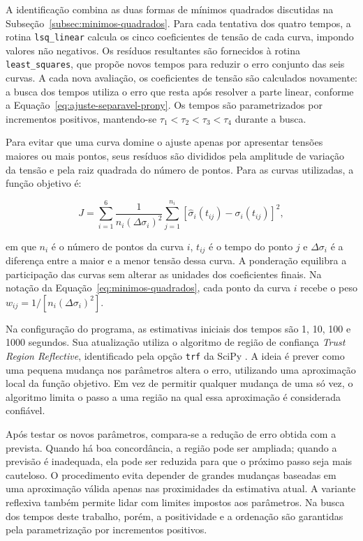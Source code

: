\documentclass[arial,centeredequations,english,brazilian,oneside,section=TITLE]{ifes8}
\begin{document}
A identificação combina as duas formas de mínimos quadrados discutidas na
Subseção~\ref{subsec:minimos-quadrados}. Para cada tentativa dos quatro tempos,
a rotina \texttt{lsq\_linear} calcula os cinco coeficientes de tensão de cada
curva, impondo valores não negativos. Os resíduos resultantes são fornecidos
à rotina \texttt{least\_squares}, que propõe novos tempos para reduzir o erro
conjunto das seis curvas. A cada nova avaliação, os coeficientes de tensão
são calculados novamente: a busca dos tempos utiliza o erro que resta após
resolver a parte linear, conforme a Equação~\eqref{eq:ajuste-separavel-prony}.
Os tempos são parametrizados por incrementos positivos, mantendo-se
$\tau_1<\tau_2<\tau_3<\tau_4$ durante a busca.

Para evitar que uma curva domine o ajuste apenas por apresentar tensões maiores ou mais
pontos, seus resíduos são divididos pela amplitude de variação da tensão e pela raiz
quadrada do número de pontos. Para as curvas utilizadas, a função objetivo é:

\begin{equation}
  \label{eq:objetivo-ajuste-global}
  J=\sum_{i=1}^{6}\frac{1}{n_i(\Delta\sigma_i)^2}
  \sum_{j=1}^{n_i}
  \left[\widehat{\sigma}_i(t_{ij})-\sigma_i(t_{ij})\right]^2,
\end{equation}

em que $n_i$ é o número de pontos da curva $i$, $t_{ij}$ é o tempo do ponto $j$ e
$\Delta\sigma_i$ é a diferença entre a maior e a menor tensão dessa curva. A ponderação
equilibra a participação das curvas sem alterar as unidades dos coeficientes finais.
Na notação da Equação~\eqref{eq:minimos-quadrados}, cada ponto da curva $i$
recebe o peso $w_{ij}=1/[n_i(\Delta\sigma_i)^2]$.

Na configuração do programa, as estimativas iniciais dos tempos são 1, 10, 100 e
1000 segundos. Sua atualização utiliza o algoritmo de região de confiança
\emph{Trust Region Reflective}, identificado pela opção \texttt{trf} da SciPy
\cite{SciPyLeastSquares}. A ideia é prever como uma pequena mudança nos parâmetros altera
o erro, utilizando uma aproximação local da função objetivo. Em vez de permitir qualquer
mudança de uma só vez, o algoritmo limita o passo a uma região na qual essa aproximação
é considerada confiável.

Após testar os novos parâmetros, compara-se a redução de erro obtida com a prevista.
Quando há boa concordância, a região pode ser ampliada; quando a previsão é inadequada,
ela pode ser reduzida para que o próximo passo seja mais cauteloso. O procedimento evita
depender de grandes mudanças baseadas em uma aproximação válida apenas nas proximidades
da estimativa atual. A variante reflexiva também permite lidar com limites impostos aos
parâmetros. Na busca dos tempos deste trabalho, porém, a positividade e a ordenação são
garantidas pela parametrização por incrementos positivos.
\end{document}
